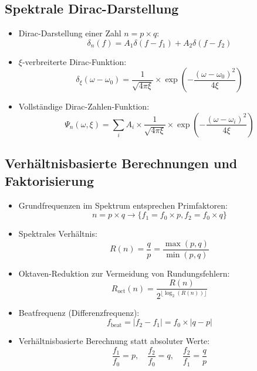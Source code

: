 \documentclass[12pt,a4paper]{article}
\begin{document}
	\subsection{Spektrale Dirac-Darstellung}
	\begin{itemize}
		\item Dirac-Darstellung einer Zahl $n = p \times q$:
		\begin{equation}
			\delta_n(f) = A_1\delta(f - f_1) + A_2\delta(f - f_2)
		\end{equation}
		
		\item $\xi$-verbreiterte Dirac-Funktion:
		\begin{equation}
			\delta_\xi(\omega - \omega_0) = \frac{1}{\sqrt{4\pi\xi}} \times \exp\left(-\frac{(\omega-\omega_0)^2}{4\xi}\right)
		\end{equation}
		
		\item Vollständige Dirac-Zahlen-Funktion:
		\begin{equation}
			\Psi_n(\omega,\xi) = \sum_i A_i \times \frac{1}{\sqrt{4\pi\xi}} \times \exp\left(-\frac{(\omega-\omega_i)^2}{4\xi}\right)
		\end{equation}
	\end{itemize}
	
	\subsection{Verhältnisbasierte Berechnungen und Faktorisierung}
	\begin{itemize}
		\item Grundfrequenzen im Spektrum entsprechen Primfaktoren:
		\begin{equation}
			n = p \times q \rightarrow \{f_1 = f_0 \times p, f_2 = f_0 \times q\}
		\end{equation}
		
		\item Spektrales Verhältnis:
		\begin{equation}
			R(n) = \frac{q}{p} = \frac{\max(p,q)}{\min(p,q)}
		\end{equation}
		
		\item Oktaven-Reduktion zur Vermeidung von Rundungsfehlern:
		\begin{equation}
			R_{\text{oct}}(n) = \frac{R(n)}{2^{\lfloor\log_2(R(n))\rfloor}}
		\end{equation}
		
		\item Beatfrequenz (Differenzfrequenz):
		\begin{equation}
			f_{\text{beat}} = |f_2 - f_1| = f_0 \times |q - p|
		\end{equation}
		
		\item Verhältnisbasierte Berechnung statt absoluter Werte:
		\begin{equation}
			\frac{f_1}{f_0} = p, \quad \frac{f_2}{f_0} = q, \quad \frac{f_2}{f_1} = \frac{q}{p}
		\end{equation}
	\end{itemize}
	
\end{document}
